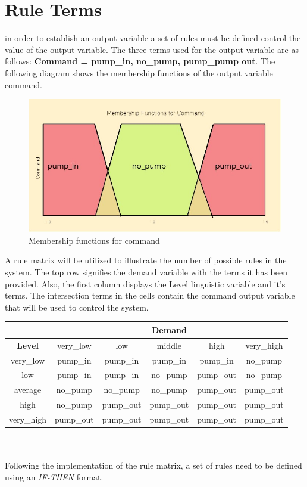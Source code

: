 \newpage

\section*{Rule Terms}
in order to establish an output variable a set of rules must be defined control the value of the output variable. The three terms used for the output variable are as follows: \textbf{Command = {pump\_in, no\_pump, pump\_pump out}}. The following diagram shows the membership functions of the output variable command.
\begin{figure}[ht]
	\begin{center}
		\advance\leftskip-3cm
		\advance\rightskip-3cm
		\includegraphics[keepaspectratio=true,scale=0.6]{__resources/command.jpg}
		\caption{Membership functions for command}
		\label{member2}
	\end{center}
\end{figure}
\newpage
A rule matrix will be utilized to illustrate the number of possible rules in the system. The top row signifies the demand variable with the terms it has been provided. Also, the first column displays the Level linguistic variable and it's terms. The intersection terms in the cells contain the command output variable that will be used to control the system.\\

\begin{tabular}{|c|c|c|c|c|c|}
	\hline 
	& \multicolumn{5}{c|}{\textbf{Demand}} \\ 
	\hline 
	\textbf{Level} & very\_low & low & middle & high & very\_high \\ 
	\hline 
	very\_low & pump\_in & pump\_in & pump\_in & pump\_in & no\_pump \\ 
	\hline 
	low & pump\_in & pump\_in & no\_pump & pump\_out & no\_pump \\ 
	\hline 
	average & no\_pump & no\_pump & no\_pump & pump\_out & pump\_out \\ 
	\hline 
	high & no\_pump & pump\_out & pump\_out & pump\_out & pump\_out \\ 
	\hline 
	very\_high & pump\_out & pump\_out & pump\_out & pump\_out & pump\_out \\ 
	\hline 
\end{tabular} \\\\
Following the implementation of the rule matrix, a set of rules need to be defined using an \textit{IF-THEN} format. 


